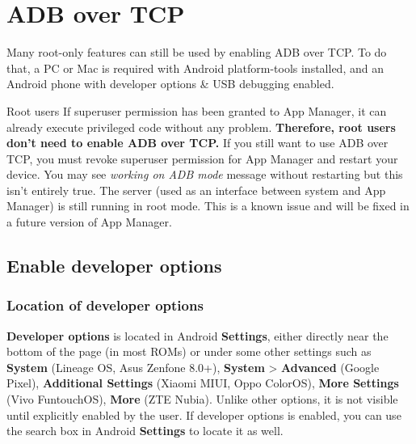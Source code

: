 \section{ADB over TCP}\label{sec:adb-over-tcp} %
Many root-only features can still be used by enabling ADB over TCP. To do that, a PC or Mac is required with Android
platform-tools installed, and an Android phone with developer options \& USB debugging enabled.

\begin{tip}{Root users}
    If superuser permission has been granted to App Manager, it can already execute privileged code without any problem.
    \textbf{Therefore, root users don't need to enable ADB over TCP.} If you still want to use ADB over TCP, you must
    revoke superuser permission for App Manager and restart your device. You may see \textit{working on ADB mode}
    message without restarting but this isn't entirely true. The server (used as an interface between system and App
    Manager) is still running in root mode. This is a known issue and will be fixed in a future version of App Manager.
\end{tip}


\subsection{Enable developer options}\label{subsec:enable-developer-options} %

\subsubsection{Location of developer options}\label{subsubsec:location-of-developer-options} %
\textbf{Developer options} is located in Android \textbf{Settings}, either directly near the bottom of the page (in most
ROMs) or under some other settings such as \textbf{System} (Lineage OS, Asus Zenfone 8.0+), \textbf{System} >
\textbf{Advanced} (Google Pixel), \textbf{Additional Settings} (Xiaomi MIUI, Oppo ColorOS), \textbf{More Settings} (Vivo
FuntouchOS), \textbf{More} (ZTE Nubia). Unlike other options, it is not visible until explicitly enabled by the user. If
developer options is enabled, you can use the search box in Android \textbf{Settings} to locate it as well.

